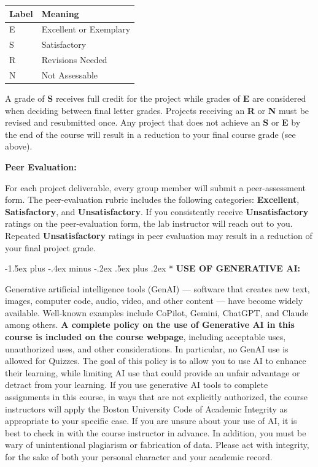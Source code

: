 \documentclass[11pt]{article}
\makeatletter
\renewcommand\section{\@startsection{section}{1}{0pt}%
  {-1.5ex plus -.4ex minus -.2ex}%
  {.5ex plus .2ex}%
  {\normalfont\Large\bfseries}}
\makeatother
\begin{document}
\begin{center}
\small
\setlength{\tabcolsep}{4pt}
\begin{tabularx}{\textwidth}{lY}
\toprule
\textbf{Label} & \textbf{Meaning} \\
\midrule
E & Excellent or Exemplary \\
S & Satisfactory \\
R & Revisions Needed \\
N & Not Assessable \\
\bottomrule
\end{tabularx}
\end{center}

A grade of \textbf{S} receives full credit for the project while grades of \textbf{E} are considered when deciding between final letter grades. Projects receiving an \textbf{R} or \textbf{N} must be revised and resubmitted once. Any project that does not achieve an \textbf{S} or \textbf{E} by the end of the course will result in a reduction to your final course grade (see above).

\textbf{Peer Evaluation:}

For each project deliverable, every group member will submit a peer-assessment form. The peer-evaluation rubric includes the following categories: \textbf{Excellent}, \textbf{Satisfactory}, and \textbf{Unsatisfactory}. If you consistently receive \textbf{Unsatisfactory} ratings on the peer-evaluation form, the lab instructor will reach out to you. Repeated \textbf{Unsatisfactory} ratings in peer evaluation may result in a reduction of your final project grade.

\section*{}
\textbf{USE OF GENERATIVE AI:}

Generative artificial intelligence tools (GenAI) — software that creates new text, images, computer code, audio, video, and other content — have become widely available. Well-known examples include CoPilot, Gemini, ChatGPT, and Claude among others. \textbf{A complete policy on the use of Generative AI in this course is included on the course webpage}, including acceptable uses, unauthorized uses, and other considerations. In particular, no GenAI use is allowed for Quizzes. The goal of this policy is to allow you to use AI to enhance their learning, while limiting AI use that could provide an unfair advantage or detract from your learning. If you use generative AI tools to complete assignments in this course, in ways that are not explicitly authorized, the course instructors will apply the Boston University Code of Academic Integrity as appropriate to your specific case. If you are unsure about your use of AI, it is best to check in with the course instructor in advance. In addition, you must be wary of unintentional plagiarism or fabrication of data. Please act with integrity, for the sake of both your personal character and your academic record.
\end{document}
